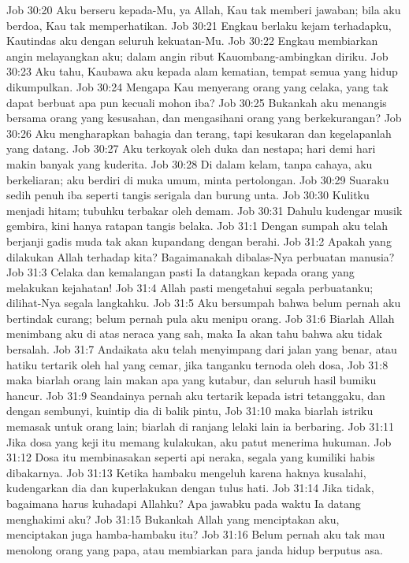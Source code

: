 Job 30:20  Aku berseru kepada-Mu, ya Allah, Kau tak memberi jawaban; bila aku berdoa, Kau tak memperhatikan.
Job 30:21  Engkau berlaku kejam terhadapku, Kautindas aku dengan seluruh kekuatan-Mu.
Job 30:22  Engkau membiarkan angin melayangkan aku; dalam angin ribut Kauombang-ambingkan diriku.
Job 30:23  Aku tahu, Kaubawa aku kepada alam kematian, tempat semua yang hidup dikumpulkan.
Job 30:24  Mengapa Kau menyerang orang yang celaka, yang tak dapat berbuat apa pun kecuali mohon iba?
Job 30:25  Bukankah aku menangis bersama orang yang kesusahan, dan mengasihani orang yang berkekurangan?
Job 30:26  Aku mengharapkan bahagia dan terang, tapi kesukaran dan kegelapanlah yang datang.
Job 30:27  Aku terkoyak oleh duka dan nestapa; hari demi hari makin banyak yang kuderita.
Job 30:28  Di dalam kelam, tanpa cahaya, aku berkeliaran; aku berdiri di muka umum, minta pertolongan.
Job 30:29  Suaraku sedih penuh iba seperti tangis serigala dan burung unta.
Job 30:30  Kulitku menjadi hitam; tubuhku terbakar oleh demam.
Job 30:31  Dahulu kudengar musik gembira, kini hanya ratapan tangis belaka.
Job 31:1  Dengan sumpah aku telah berjanji gadis muda tak akan kupandang dengan berahi.
Job 31:2  Apakah yang dilakukan Allah terhadap kita? Bagaimanakah dibalas-Nya perbuatan manusia?
Job 31:3  Celaka dan kemalangan pasti Ia datangkan kepada orang yang melakukan kejahatan!
Job 31:4  Allah pasti mengetahui segala perbuatanku; dilihat-Nya segala langkahku.
Job 31:5  Aku bersumpah bahwa belum pernah aku bertindak curang; belum pernah pula aku menipu orang.
Job 31:6  Biarlah Allah menimbang aku di atas neraca yang sah, maka Ia akan tahu bahwa aku tidak bersalah.
Job 31:7  Andaikata aku telah menyimpang dari jalan yang benar, atau hatiku tertarik oleh hal yang cemar, jika tanganku ternoda oleh dosa,
Job 31:8  maka biarlah orang lain makan apa yang kutabur, dan seluruh hasil bumiku hancur.
Job 31:9  Seandainya pernah aku tertarik kepada istri tetanggaku, dan dengan sembunyi, kuintip dia di balik pintu,
Job 31:10  maka biarlah istriku memasak untuk orang lain; biarlah di ranjang lelaki lain ia berbaring.
Job 31:11  Jika dosa yang keji itu memang kulakukan, aku patut menerima hukuman.
Job 31:12  Dosa itu membinasakan seperti api neraka, segala yang kumiliki habis dibakarnya.
Job 31:13  Ketika hambaku mengeluh karena haknya kusalahi, kudengarkan dia dan kuperlakukan dengan tulus hati.
Job 31:14  Jika tidak, bagaimana harus kuhadapi Allahku? Apa jawabku pada waktu Ia datang menghakimi aku?
Job 31:15  Bukankah Allah yang menciptakan aku, menciptakan juga hamba-hambaku itu?
Job 31:16  Belum pernah aku tak mau menolong orang yang papa, atau membiarkan para janda hidup berputus asa.
